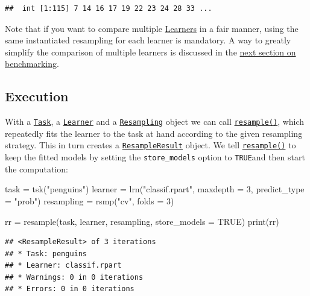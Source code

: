 \documentclass[
]{scrbook}
\newenvironment{Shaded}{\begin{snugshade}}{\end{snugshade}}
\newcommand{\AttributeTok}[1]{\textcolor[rgb]{0.77,0.63,0.00}{#1}}
\newcommand{\ConstantTok}[1]{\textcolor[rgb]{0.00,0.00,0.00}{#1}}
\newcommand{\DecValTok}[1]{\textcolor[rgb]{0.00,0.00,0.81}{#1}}
\newcommand{\FunctionTok}[1]{\textcolor[rgb]{0.00,0.00,0.00}{#1}}
\newcommand{\NormalTok}[1]{#1}
\newcommand{\OtherTok}[1]{\textcolor[rgb]{0.56,0.35,0.01}{#1}}
\newcommand{\StringTok}[1]{\textcolor[rgb]{0.31,0.60,0.02}{#1}}
\renewenvironment{Shaded} {\begin{snugshade}\small} {\end{snugshade}}
\begin{document}
\begin{verbatim}
##  int [1:115] 7 14 16 17 19 22 23 24 28 33 ...
\end{verbatim}

Note that if you want to compare multiple \protect\hyperlink{learners}{Learners} in a fair manner, using the same instantiated resampling for each learner is mandatory.
A way to greatly simplify the comparison of multiple learners is discussed in the \protect\hyperlink{benchmarking}{next section on benchmarking}.

\hypertarget{resampling-exec}{%
\subsection{Execution}\label{resampling-exec}}

With a \href{https://mlr3.mlr-org.com/reference/Task.html}{\texttt{Task}}, a \href{https://mlr3.mlr-org.com/reference/Learner.html}{\texttt{Learner}} and a \href{https://mlr3.mlr-org.com/reference/Resampling.html}{\texttt{Resampling}} object we can call \href{https://mlr3.mlr-org.com/reference/resample.html}{\texttt{resample()}}, which repeatedly fits the learner to the task at hand according to the given resampling strategy.
This in turn creates a \href{https://mlr3.mlr-org.com/reference/ResampleResult.html}{\texttt{ResampleResult}} object.
We tell \href{https://mlr3.mlr-org.com/reference/resample.html}{\texttt{resample()}} to keep the fitted models by setting the \texttt{store\_models} option to \texttt{TRUE}and then start the computation:

\begin{Shaded}
\begin{Highlighting}[]
\NormalTok{task }\OtherTok{=} \FunctionTok{tsk}\NormalTok{(}\StringTok{"penguins"}\NormalTok{)}
\NormalTok{learner }\OtherTok{=} \FunctionTok{lrn}\NormalTok{(}\StringTok{"classif.rpart"}\NormalTok{, }\AttributeTok{maxdepth =} \DecValTok{3}\NormalTok{, }\AttributeTok{predict\_type =} \StringTok{"prob"}\NormalTok{)}
\NormalTok{resampling }\OtherTok{=} \FunctionTok{rsmp}\NormalTok{(}\StringTok{"cv"}\NormalTok{, }\AttributeTok{folds =} \DecValTok{3}\NormalTok{)}

\NormalTok{rr }\OtherTok{=} \FunctionTok{resample}\NormalTok{(task, learner, resampling, }\AttributeTok{store\_models =} \ConstantTok{TRUE}\NormalTok{)}
\FunctionTok{print}\NormalTok{(rr)}
\end{Highlighting}
\end{Shaded}

\begin{verbatim}
## <ResampleResult> of 3 iterations
## * Task: penguins
## * Learner: classif.rpart
## * Warnings: 0 in 0 iterations
## * Errors: 0 in 0 iterations
\end{verbatim}
\end{document}
